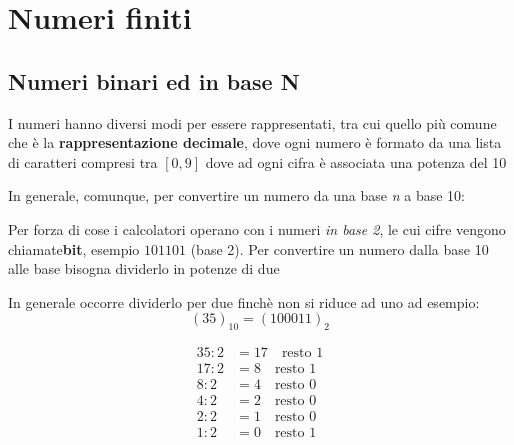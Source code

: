 \section{Numeri finiti}
\subsection{Numeri binari ed in base N}
I numeri hanno diversi modi per essere rappresentati, tra cui quello più comune che è la \textbf{rappresentazione decimale}, dove ogni numero è formato da una lista di caratteri compresi tra $[0,9]$ dove ad ogni cifra è associata una potenza del 10
\\

In generale, comunque, per convertire un numero da una base \textit{n} a base 10:

Per forza di cose i calcolatori operano con i numeri \textit{in base 2}, le cui cifre vengono chiamate\textbf{bit}, esempio $101101$ (base 2).
Per convertire un numero dalla base 10 alle base bisogna dividerlo in potenze di due 
\esempio{
    \[
        37 \, (\text{base } 10) = 32 + 4 + 1 = 1 \cdot 2^5 + 0 \cdot 2^4 + 0 \cdot 2^3 + 1 \cdot 2^2 + 0 \cdot 2^1 + 1 \cdot 2^0 = 100101 \, (\text{base } 2)
    \]
}

In generale occorre dividerlo per due finchè non si riduce ad uno ad esempio: 
\[
(35)_{10} = (100011)_2
\]

\begin{align*}
    35 : 2 &= 17 \quad \text{resto } 1 \\
    17 : 2 &= 8  \quad \text{resto } 1 \\
    8 : 2  &= 4  \quad \text{resto } 0 \\
    4 : 2  &= 2  \quad \text{resto } 0 \\
    2 : 2  &= 1  \quad \text{resto } 0 \\
    1 : 2  &= 0  \quad \text{resto } 1
    \end{align*}
    
    
    

